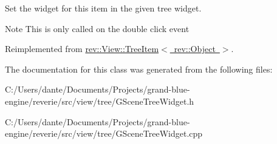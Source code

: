 Set the widget for this item in the given tree widget. 

\begin{DoxyNote}{Note}
This is only called on the double click event 
\end{DoxyNote}


Reimplemented from \mbox{\hyperlink{classrev_1_1_view_1_1_tree_item_a24faa4e374ec0728c7eda8f50ca575df}{rev\+::\+View\+::\+Tree\+Item$<$ rev\+::\+Object $>$}}.



The documentation for this class was generated from the following files\+:\begin{DoxyCompactItemize}
\item 
C\+:/\+Users/dante/\+Documents/\+Projects/grand-\/blue-\/engine/reverie/src/view/tree/G\+Scene\+Tree\+Widget.\+h\item 
C\+:/\+Users/dante/\+Documents/\+Projects/grand-\/blue-\/engine/reverie/src/view/tree/G\+Scene\+Tree\+Widget.\+cpp\end{DoxyCompactItemize}
